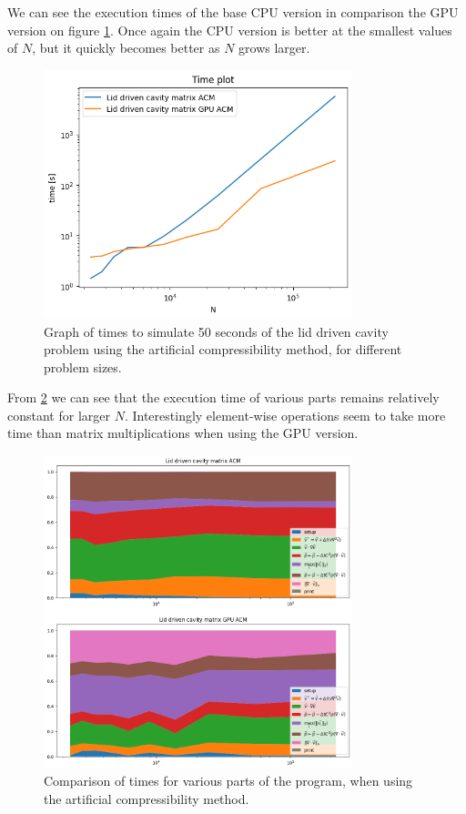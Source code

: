 \documentclass{article}
\begin{document}
We can see the execution times of the base CPU version in comparison the GPU version on figure 
\ref{fig:lidDrivenACM_time}.
Once again the CPU version is better at the smallest values of \(N\), but it quickly becomes 
better as \(N\) grows larger.
\begin{figure}[h!] 
    \centering 
    \includegraphics[width=0.8\textwidth]{plots/lidDrivenACM_time.png} 
    \caption{Graph of times to simulate 50 seconds of the lid driven cavity problem using
    the artificial compressibility method, for different problem sizes.} 
    \label{fig:lidDrivenACM_time} 
\end{figure}
From \ref{fig:lidDrivenACM_comp} we can see that the execution time of various parts remains relatively
constant for larger \(N\). Interestingly element-wise operations seem to take more time than 
matrix multiplications when using the GPU version.
\begin{figure}[h!] 
    \centering 
    \includegraphics[width=0.8\textwidth]{plots/lidDrivenACM_comp.png} 
    \caption{Comparison of times for various parts of the program, when using the artificial compressibility
    method.} 
    \label{fig:lidDrivenACM_comp} 
\end{figure}
\end{document}
